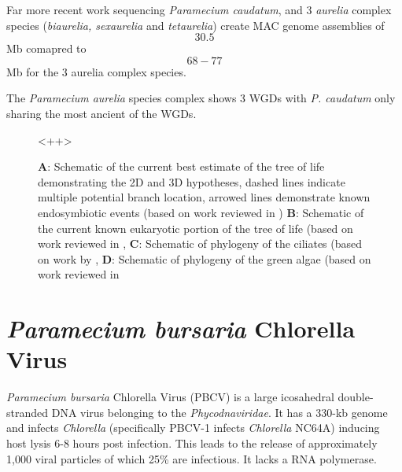 Far more recent work sequencing \textit{Paramecium caudatum}, 
and 3 \textit{aurelia} complex species (\textit{biaurelia, sexaurelia} and \textit{tetaurelia})
create MAC genome assemblies of \[30.5\] Mb comapred to \[68-77\] Mb for the 3 aurelia complex species.
\citep{McGrath2014}


The \textit{Paramecium aurelia} species complex shows 3 WGDs with \textit{P. caudatum}
only sharing the most ancient of the WGDs.

\citep{McGrath2014}




\begin{figure}
    \caption{\textbf{A}: Schematic of the current best estimate of the tree of life demonstrating the 2D and 3D hypotheses,
dashed lines indicate multiple potential branch location, arrowed lines demonstrate known endosymbiotic events (based on work reviewed in \citep{Gribaldo2010})
\textbf{B}: Schematic of the current known eukaryotic portion of the tree of life (based on work reviewed in \citep{Burki2014,Adl2013},
\textbf{C}: Schematic of phylogeny of the ciliates (based on work by \citep{Bachvaroff2011,},
\textbf{D}: Schematic of phylogeny of the green algae (based on work reviewed in \citep{Leliaert2012,}}
    <++>
\end{figure}

%
%
%
%
%
\section{\textit{Paramecium bursaria} Chlorella Virus}

\textit{Paramecium bursaria} Chlorella Virus (PBCV) is a large icosahedral double-stranded DNA virus belonging to 
the \textit{Phycodnaviridae}.  It has a 330-kb genome and infects \textit{Chlorella} 
(specifically PBCV-1 infects \textit{Chlorella} NC64A) inducing host lysis 6-8 hours post infection.
This leads to the release of approximately 1,000 viral particles of which 25\% are infectious. 
It lacks a RNA polymerase. \citep{Yanai-Balser2010}

